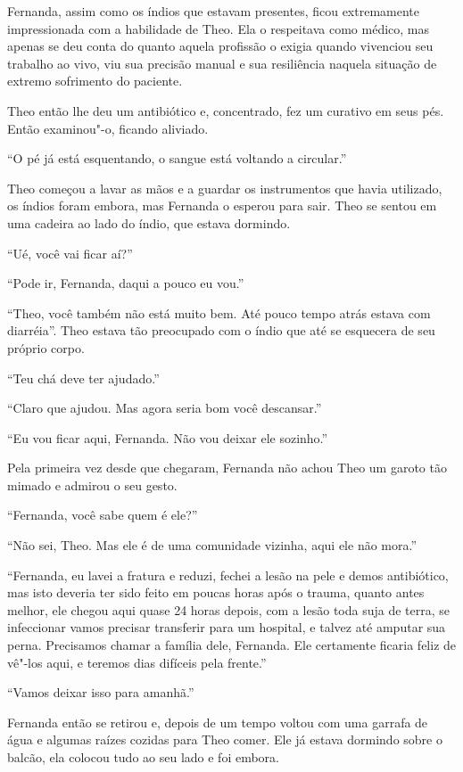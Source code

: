 Fernanda, assim como os índios que estavam presentes, ficou extremamente
impressionada com a habilidade de Theo. Ela o respeitava como médico,
mas apenas se deu conta do quanto aquela profissão o exigia quando
vivenciou seu trabalho ao vivo, viu sua precisão manual e sua
resiliência naquela situação de extremo sofrimento do paciente.

Theo então lhe deu um antibiótico e, concentrado, fez um curativo em
seus pés. Então examinou"-o, ficando aliviado.

``O pé já está esquentando, o sangue está voltando a circular.''

Theo começou a lavar as mãos e a guardar os instrumentos que havia
utilizado, os índios foram embora, mas Fernanda o esperou para sair.
Theo se sentou em uma cadeira ao lado do índio, que estava dormindo.

``Ué, você vai ficar aí?''

``Pode ir, Fernanda, daqui a pouco eu vou.''

``Theo, você também não está muito bem. Até pouco tempo atrás estava com
diarréia''. Theo estava tão preocupado com o índio que até se esquecera
de seu próprio corpo.

``Teu chá deve ter ajudado.''

``Claro que ajudou. Mas agora seria bom você descansar.''

``Eu vou ficar aqui, Fernanda. Não vou deixar ele sozinho.''

Pela primeira vez desde que chegaram, Fernanda não achou Theo um garoto
tão mimado e admirou o seu gesto.

``Fernanda, você sabe quem é ele?''

``Não sei, Theo. Mas ele é de uma comunidade vizinha, aqui ele não
mora.''

``Fernanda, eu lavei a fratura e reduzi, fechei a lesão na pele e demos
antibiótico, mas isto deveria ter sido feito em poucas horas após o
trauma, quanto antes melhor, ele chegou aqui quase 24 horas depois, com
a lesão toda suja de terra, se infeccionar vamos precisar transferir
para um hospital, e talvez até amputar sua perna. Precisamos chamar a
família dele, Fernanda. Ele certamente ficaria feliz de vê"-los aqui, e
teremos dias difíceis pela frente.''

``Vamos deixar isso para amanhã.''

Fernanda então se retirou e, depois de um tempo voltou com uma garrafa
de água e algumas raízes cozidas para Theo comer. Ele já estava dormindo
sobre o balcão, ela colocou tudo ao seu lado e foi embora.

